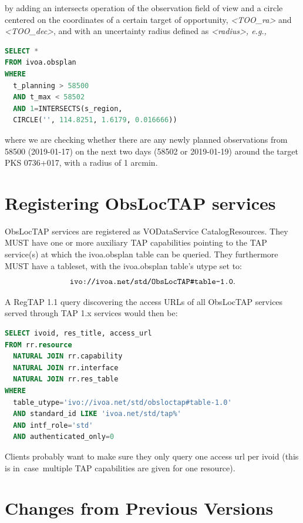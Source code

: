 \documentclass[11pt,a4paper]{ivoa}
\begin{document}
by adding an intersects operation of the observation field of view and a circle
centered on the coordinates of a certain target of opportunity,
\textit{<TOO\_ra>} and \textit{<TOO\_dec>}, and with an uncertainty
radius defined as \textit{<radius>, e.g.,}

\begin{lstlisting}[language=SQL]
SELECT * 
FROM ivoa.obsplan
WHERE
  t_planning > 58500
  AND t_max < 58502
  AND 1=INTERSECTS(s_region,
  CIRCLE('', 114.8251, 1.6179, 0.016666))
\end{lstlisting}
where we are checking whether there are any newly planned observations from
58500 (2019-01-17) on the next two days (58502 or 2019-01-19) around the target
PKS 0736+017, with a radius of 1 arcmin.
\par


\section{Registering ObsLocTAP services}
\label{sec:Registering}
ObsLocTAP services are registered as VODataService CatalogResources. They MUST
have one or more auxiliary TAP capabilities pointing to the TAP service(s) at
which the ivoa.obsplan table can be queried. They furthermore MUST have a
tableset, with the ivoa.obsplan table's utype set to:
$$\hbox{\verb|ivo://ivoa.net/std/ObsLocTAP#table-1.0|}.$$

A RegTAP 1.1 query discovering the access URLs of all ObsLocTAP services served
through TAP 1.x services would then be:

\begin{lstlisting}[language=SQL]
SELECT ivoid, res_title, access_url
FROM rr.resource
  NATURAL JOIN rr.capability
  NATURAL JOIN rr.interface
  NATURAL JOIN rr.res_table
WHERE
  table_utype='ivo://ivoa.net/std/obsloctap#table-1.0'
  AND standard_id LIKE 'ivoa.net/std/tap%'
  AND intf_role='std'
  AND authenticated_only=0
\end{lstlisting}
Clients probably want to make sure they only query one access url per ivoid
(this is in\ case\ multiple TAP capabilities are given for one resource).
\par

\appendix
\section{Changes from Previous Versions}
\end{document}
